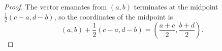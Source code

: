 \begin{Exercise}
	\begin{proof}
		The vector emanates from $(a,b)$ terminates at the midpoint $\frac{1}{2}(c-a,d-b)$, so the coordinates of the midpoint is 
		$$
		(a,b) + \frac{1}{2}(c-a,d-b) = \left( \frac{a+c}{2}, \frac{b+d}{2} \right).
		$$
	\end{proof}
\end{Exercise}